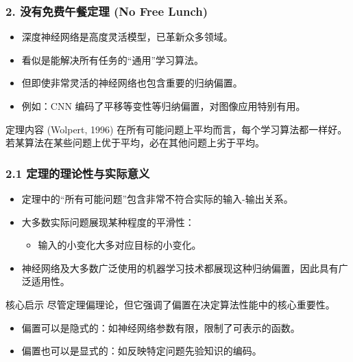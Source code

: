 \documentclass[t,aspectratio=169]{beamer} %
\begin{document}
\begin{frame}
    \frametitle{2. 没有免费午餐定理 (No Free Lunch)}
    \begin{itemize}
        \item 深度神经网络是高度灵活模型，已革新众多领域。
        \item 看似是能解决所有任务的\alert{“通用”学习算法}。
        \item 但即使非常灵活的神经网络也包含\alert{重要的归纳偏置}。
        \item 例如：CNN 编码了\alert{平移等变性}等归纳偏置，对图像应用特别有用。
    \end{itemize}
    \begin{block}{定理内容 (Wolpert, 1996)}
        在所有可能问题上平均而言，\alert{每个学习算法都一样好}。\\
        若某算法在某些问题上优于平均，必在其他问题上劣于平均。
    \end{block}
\end{frame}

\begin{frame}
    \frametitle{2.1 定理的理论性与实际意义}
    \begin{itemize}
        \item 定理中的“所有可能问题”包含\alert{非常不符合实际}的输入-输出关系。
        \item 大多数实际问题展现某种程度的\alert{平滑性}：
        \begin{itemize}
            \item 输入的小变化大多对应目标的小变化。
        \end{itemize}
        \item 神经网络及大多数广泛使用的机器学习技术都展现这种归纳偏置，因此具有\alert{广泛适用性}。
    \end{itemize}
    \begin{block}{核心启示}
        尽管定理偏理论，但它强调了\alert{偏置在决定算法性能中的核心重要性}。
        \begin{itemize}
            \item 偏置可以是\alert{隐式}的：如神经网络参数有限，限制了可表示的函数。
            \item 偏置也可以是\alert{显式}的：如反映特定问题先验知识的编码。
        \end{itemize}
    \end{block}
\end{frame}
\end{document}
